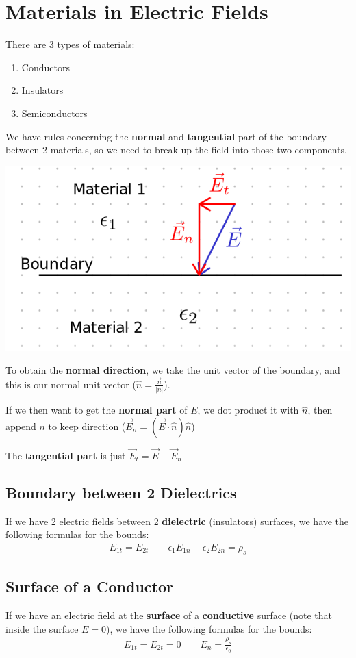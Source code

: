 \documentclass[12pt,letterpaper]{article} \usepackage{amsmath} \usepackage{graphicx} \usepackage[margin=1in]{geometry} \usepackage{longtable}  \usepackage{amssymb}
\begin{document}
	\section{Materials in Electric Fields}
	There are 3 types of materials:
	\begin{enumerate}[]
		\item Conductors
		\item Insulators
		\item Semiconductors
	\end{enumerate}

	We have rules concerning the \textbf{normal} and \textbf{tangential} part of the boundary between 2 materials, so we need to break up the field into those two components. 
	
	\begin{center}
		\includegraphics[width=0.55\linewidth]{boundary-conditions-E}
	\end{center}
	
	
	To obtain the \textbf{normal direction}, we take the unit vector of the boundary, and this is our normal unit vector ($\hat n = \frac{\vec n}{|n|}$).
	
	If we then want to get the \textbf{normal part} of $E$, we dot product it with $\hat n$, then append $n$ to keep direction ($\vec E_n = (\vec E\cdot \hat n)\hat n$)
	
	The \textbf{tangential part }is just $\vec E_t = \vec E - \vec E_n$

	\subsection{Boundary between 2 Dielectrics}
	If we have 2 electric fields between 2 \textbf{dielectric} (insulators) surfaces, we have the following formulas for the bounds:
	\begin{align*}
		E_{1t} = E_{2t} \qquad \epsilon_1E_{1n}-\epsilon_2 E_{2n} = \rho_s
	\end{align*}

	\subsection{Surface of a Conductor}
	If we have an electric field at the \textbf{surface }of a \textbf{conductive} surface (note that inside the surface $E=0$), we have the following formulas for the bounds:
	\begin{align*}
		E_{1t} = E_{2t} = 0 \qquad E_{n} = \frac{\rho_s}{\epsilon_0}
	\end{align*}
\end{document}
